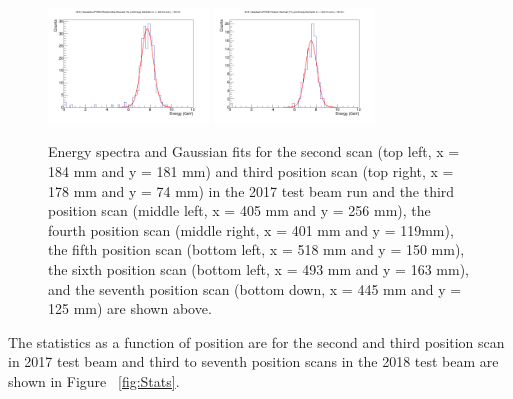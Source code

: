 \documentclass[hidelinks,11pt]{article}
\numberwithin{figure}{section}
\numberwithin{table}{section}
\begin{document}
\begin{figure}[hbtp]
\begin{center}
\includegraphics[width=0.38\textwidth]{Plots/Spectra/Plot_2018_Interpolation-sPHENIX-Rotation-More-Reversed_Fits_prod_493-163.png}
\includegraphics[width=0.38\textwidth]{Plots/Spectra/Plot_2018_Interpolation-sPHENIX-Rotation-Reversed_Fits_prod_445-125.png}
\caption{Energy spectra and Gaussian fits for the second scan (top left, x = 184 mm and y = 181 mm) and third position scan (top right, x = 178 mm and y = 74 mm) in the 2017 test beam run and the third position scan (middle left, x = 405 mm and y = 256 mm), the fourth position scan (middle right, x = 401 mm and y = 119mm), the fifth position scan (bottom left, x = 518 mm and y = 150 mm), the sixth position scan (bottom left, x = 493 mm and y = 163 mm), and the seventh position scan (bottom down, x = 445 mm and y = 125 mm) are shown above.}
\label{fig:Espect}
\end{center}
\end{figure} 

\noindent The statistics as a function of position are for the second and third position scan in 2017 test beam and third to seventh position scans in the 2018 test beam are shown in Figure ~\ref{fig:Stats}. 
\end{document}
